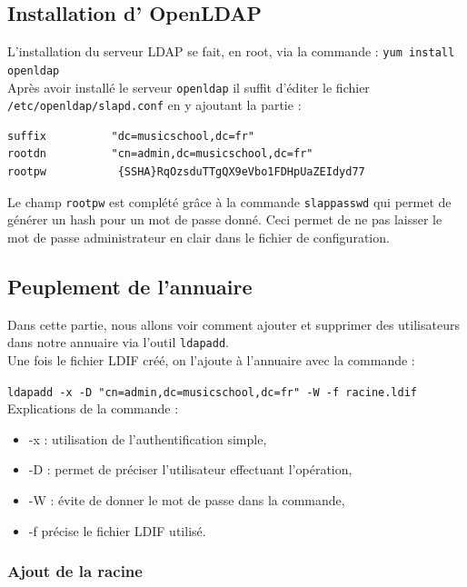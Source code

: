 \documentclass[12pt,a4paper,notitlepage]{article}
\begin{document}
\subsection{Installation d' OpenLDAP}

L'installation du serveur LDAP se fait, en root, via la commande : \texttt{yum install openldap}\\

Après avoir installé le serveur \texttt{openldap} il suffit d'éditer le fichier \texttt{/etc/openldap/slapd.conf} en y ajoutant la partie : 

\begin{lstlisting}[title=Contenu du fichier slapd.conf]
suffix          "dc=musicschool,dc=fr"
rootdn          "cn=admin,dc=musicschool,dc=fr"
rootpw           {SSHA}RqOzsduTTgQX9eVbo1FDHpUaZEIdyd77

\end{lstlisting}

Le champ  \texttt{rootpw} est complété grâce à la commande \texttt{slappasswd} qui permet de générer un hash pour un mot de passe donné. Ceci permet de ne pas laisser le mot de passe administrateur en clair dans le fichier de configuration.\\


\subsection{Peuplement de l'annuaire}
Dans cette partie, nous allons voir comment ajouter et supprimer des utilisateurs dans notre annuaire via l'outil \texttt{ldapadd}.\\

Une fois le fichier LDIF créé, on l'ajoute à l'annuaire avec la commande :

\noindent \texttt{ldapadd -x -D "cn=admin,dc=musicschool,dc=fr" -W -f racine.ldif}\\

Explications de la commande :
\begin{itemize}
\item -x : utilisation de l'authentification simple,
\item -D : permet de préciser l'utilisateur effectuant l'opération,
\item -W : évite de donner le mot de passe dans la commande,
\item -f précise le fichier LDIF utilisé. 
\end{itemize}


\subsubsection{Ajout de la racine}
\end{document}
